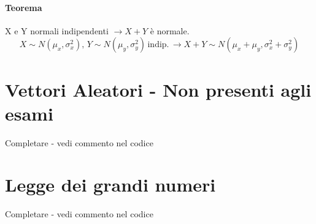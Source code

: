 \paragraph*{Teorema} X e Y normali indipendenti $\rightarrow X+Y$ è normale.
\begin{equation*}
	X \sim N(\mu_x, \sigma^{2}_x), \, Y \sim N(\mu_y, \sigma^{2}_y)\, \text{indip.}\,
	\rightarrow X+Y \sim N(\mu_x+\mu_y, \sigma^{2}_x + \sigma^{2}_y)
\end{equation*}
\section*{Vettori Aleatori - Non presenti agli esami}
Completare - vedi commento nel codice
\section{Legge dei grandi numeri}
Completare - vedi commento nel codice

